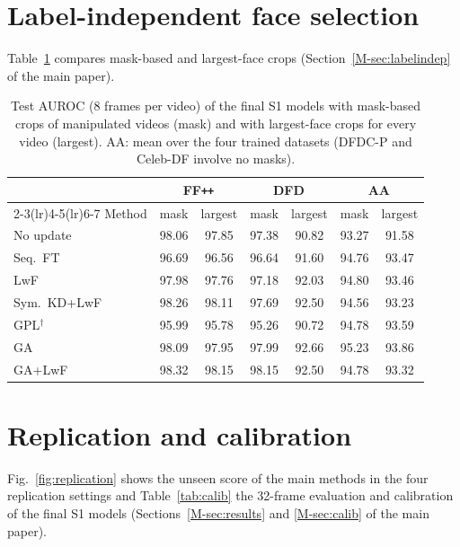 \documentclass[journal]{IEEEtran}
\newcommand{\ffpp}{FF\texttt{++}}
\begin{document}
\section{Label-independent face selection}
Table~\ref{tab:labelindep} compares mask-based and largest-face crops (Section~\ref{M-sec:labelindep} of the main paper).

\begin{table}[t]
\caption{Test AUROC (8 frames per video) of the final S1 models with mask-based crops of manipulated videos (mask) and with largest-face crops for every video (largest). AA: mean over the four trained datasets (DFDC-P and Celeb-DF involve no masks).}
\label{tab:labelindep}
\centering
\footnotesize
\setlength{\tabcolsep}{2.6pt}
\begin{tabular}{@{}lcccccc@{}}
\toprule
& \multicolumn{2}{c}{\ffpp{}} & \multicolumn{2}{c}{DFD} & \multicolumn{2}{c}{AA} \\
\cmidrule(lr){2-3}\cmidrule(lr){4-5}\cmidrule(lr){6-7}
Method & mask & largest & mask & largest & mask & largest \\
\midrule
No update & 98.06 & 97.85 & 97.38 & 90.82 & 93.27 & 91.58 \\
Seq.\ FT & 96.69 & 96.56 & 96.64 & 91.60 & 94.76 & 93.47 \\
LwF & 97.98 & 97.76 & 97.18 & 92.03 & 94.80 & 93.46 \\
Sym.\ KD+LwF & 98.26 & 98.11 & 97.69 & 92.50 & 94.56 & 93.23 \\
GPL$^\dagger$ & 95.99 & 95.78 & 95.26 & 90.72 & 94.78 & 93.59 \\
GA & 98.09 & 97.95 & 97.99 & 92.66 & 95.23 & 93.86 \\
GA+LwF & 98.32 & 98.15 & 98.15 & 92.50 & 94.78 & 93.32 \\
\bottomrule
\end{tabular}
\end{table}

\section{Replication and calibration}
Fig.~\ref{fig:replication} shows the unseen score of the main methods in the four replication settings and Table~\ref{tab:calib} the 32-frame evaluation and calibration of the final S1 models (Sections~\ref{M-sec:results} and \ref{M-sec:calib} of the main paper).
\end{document}
